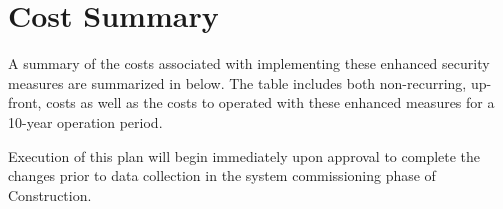 \section{Cost Summary}\label{sec:cost}

A summary of the costs associated with implementing these enhanced security measures are summarized in  below. The table includes both non-recurring, up-front, costs as well as the costs to operated with these enhanced measures for a 10-year operation period. 



Execution of this plan will begin immediately upon approval to complete the changes prior to data collection in the system commissioning phase of Construction.
